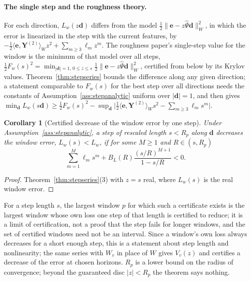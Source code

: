 \documentclass[11pt]{article}
\newtheorem{corollary}{Corollary}
\theoremstyle{definition}
\theoremstyle{remark}
\newcommand{\ee}{\mathbf{e}}
\newcommand{\Psih}{\hat\Psi}
\begin{document}
\paragraph{The single step and the roughness theory.}
For each direction, $L_w(z\mathbf d)$ differs from the model $\tfrac12\|\ee-z\Psih\mathbf d\|_W^2$, in which the error is linearized in the step with the current features, by $-\tfrac12\langle\ee,\mathbf Y^{(2)}\rangle_Wz^2+\sum_{m\ge3}\ell_mz^m$.
The roughness paper's single-step value for the window is the minimum of that model over all steps, $\tfrac12F_w(s)^2=\min_{|\mathbf d|=1,\,0\le z\le s}\tfrac12\|\ee-z\Psih\mathbf d\|_W^2$, certified from below by its Krylov values.
Theorem~\ref{thm:stepseries} bounds the difference along any given direction; a statement comparable to $F_w(s)$ for the best step over all directions needs the constants of Assumption~\ref{ass:stepanalytic} uniform over $|\mathbf d|=1$, and then gives $\min_{\mathbf d}L_w(s\mathbf d)\ge\tfrac12F_w(s)^2-\sup_{\mathbf d}\big|\tfrac12\langle\ee,\mathbf Y^{(2)}\rangle_Ws^2-\sum_{m\ge3}\ell_ms^m\big|$.

\begin{corollary}[Certified decrease of the window error by one step]\label{cor:stepcap}
Under Assumption~\ref{ass:stepanalytic}, a step of rescaled length $s<R_p$ along $\mathbf d$ decreases the window error, $L_w(s)<L_w$, if for some $M\ge1$ and $R\in(s,R_p)$
\[
\sum_{m=1}^M\ell_ms^m+B_L(R)\frac{(s/R)^{M+1}}{1-s/R}<0 .
\]
\end{corollary}

\begin{proof}
Theorem~\ref{thm:stepseries}(3) with $z=s$ real, where $L_w(s)$ is the real window error.
\end{proof}

For a step length $s$, the largest window $p$ for which such a certificate exists is the largest window whose own loss one step of that length is certified to reduce; it is a limit of certification, not a proof that the step fails for longer windows, and the set of certified windows need not be an interval.
Since a window's own loss always decreases for a short enough step, this is a statement about step length and nonlinearity; the same series with $W_v$ in place of $W$ gives $V_v(z)$ and certifies a decrease of the error at chosen horizons.
$R_p$ is a lower bound on the radius of convergence; beyond the guaranteed disc $|z|<R_p$ the theorem says nothing.
\end{document}
